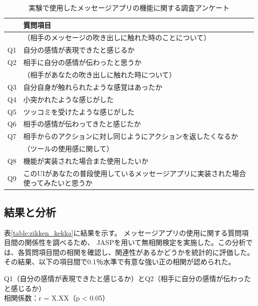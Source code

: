 \documentclass[11pt,a4paper]{ltjsreport}
\newcommand{\bhline}{\noalign{\hrule height 1.2pt}} %
\begin{document}
\vspace{\baselineskip} %
\begin{table}[!ph]
    \caption{実験で使用したメッセージアプリの機能に関する調査アンケート}
    \label{table:zikken_sitsumon}
    \vspace{5mm}
    \centering
    \begin{tabular}{p{1cm}p{12cm}} %
        \bhline
         & 質問項目 \\ %
        \hline
        & （相手のメッセージの吹き出しに触れた時のことについて） \\
        Q1 & 自分の感情が表現できたと感じるか \\
        Q2 & 相手に自分の感情が伝わったと思うか \\
        & （相手があなたの吹き出しに触れた時について） \\
        Q3 & 自分自身が触れられたような感覚はあったか \\
        Q4 & 小突かれたような感じがした \\
        Q5 & ツッコミを受けたような感じがした \\
        Q6 & 相手の感情が伝わってきたと感じたか \\
        Q7 & 相手からのアクションに対し同じようにアクションを返したくなるか \\
        & （ツールの使用感に関して） \\
        Q8 & 機能が実装された場合また使用したいか \\
        Q9 & このUIがあなたの普段使用しているメッセージアプリに実装された場合使ってみたいと思うか \\
        \hline
    \end{tabular}
\end{table}

\subsection{結果と分析}
表\ref{table:zikken_kekka}に結果を示す。
メッセージアプリの使用に関する質問項目間の関係性を調べるため、
JASP\cite{book_JASP}を用いて無相関検定を実施した。この分析では、各質問項目間の相関を確認し、関連性があるかどうかを統計的に評価した。
その結果、以下の項目間で0.1％水準で有意な強い正の相関が認められた。

Q1（自分の感情が表現できたと感じるか）とQ2（相手に自分の感情が伝わったと感じるか）\\
相関係数：r = X.XX（p < 0.05）\\
\end{document}
